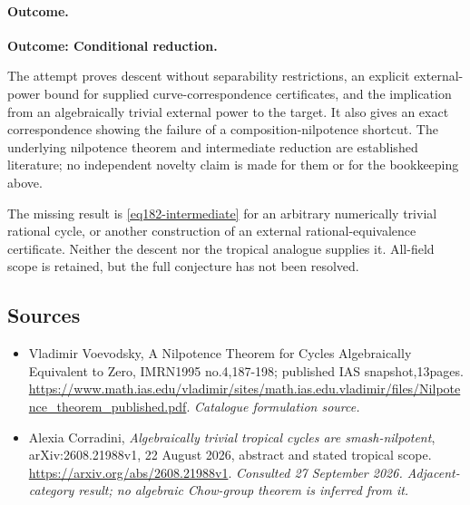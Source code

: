 \documentclass[11pt,a4paper]{article}
\numberwithin{equation}{section}
\begin{document}
\paragraph{Outcome.}
\textbf{Outcome: Conditional reduction.}

The attempt proves descent without separability restrictions, an explicit
external-power bound for supplied curve-correspondence certificates, and
the implication from an algebraically trivial external power to the target.
It also gives an exact correspondence showing the failure of a
composition-nilpotence shortcut. The underlying nilpotence theorem and
intermediate reduction are established literature; no independent novelty
claim is made for them or for the bookkeeping above.

The missing result is \eqref{eq182-intermediate} for an arbitrary
numerically trivial rational cycle, or another construction of an external
rational-equivalence certificate. Neither the descent nor the tropical
analogue supplies it. All-field scope is retained, but the full conjecture
has not been resolved.
\subsection{Sources}
\begin{itemize}\raggedright
\item[\textnormal{[S1]}]\hypertarget{source:182:1}{} Vladimir Voevodsky, A Nilpotence Theorem for Cycles Algebraically Equivalent to Zero, IMRN1995 no.4,187-198; published IAS snapshot,13pages.
\url{https://www.math.ias.edu/vladimir/sites/math.ias.edu.vladimir/files/Nilpotence_theorem_published.pdf}.
{\small\textit{Catalogue formulation source.}}
\item[\textnormal{[E1]}]\hypertarget{extra:182:1}{} Alexia Corradini,
\emph{Algebraically trivial tropical cycles are smash-nilpotent},
arXiv:2608.21988v1, 22 August 2026, abstract and stated tropical scope.
\url{https://arxiv.org/abs/2608.21988v1}.
{\small\textit{Consulted 27 September 2026. Adjacent-category result;
no algebraic Chow-group theorem is inferred from it.}}
\end{itemize}
\end{document}
